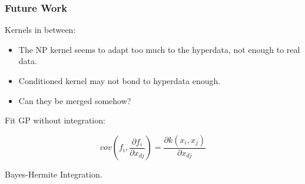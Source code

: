 \documentclass{beamer}
\begin{document}
	\begin{frame}
		\frametitle{Future Work}
		
		Kernels in between:
		
		\begin{itemize}
			\item The NP kernel seems to adapt too much to the hyperdata, not enough to real data.
			\item Conditioned kernel may not bond to hyperdata enough.
			\item Can they be merged somehow?
		\end{itemize}
		
		Fit GP without integration:
		
		$$cov(f_i, \frac{\partial f_i}{\partial x_{dj}}) = \frac{\partial k(x_i, x_j)}{\partial x_{dj}}$$
		
		Bayes-Hermite Integration.
		
	\end{frame}
\end{document}
